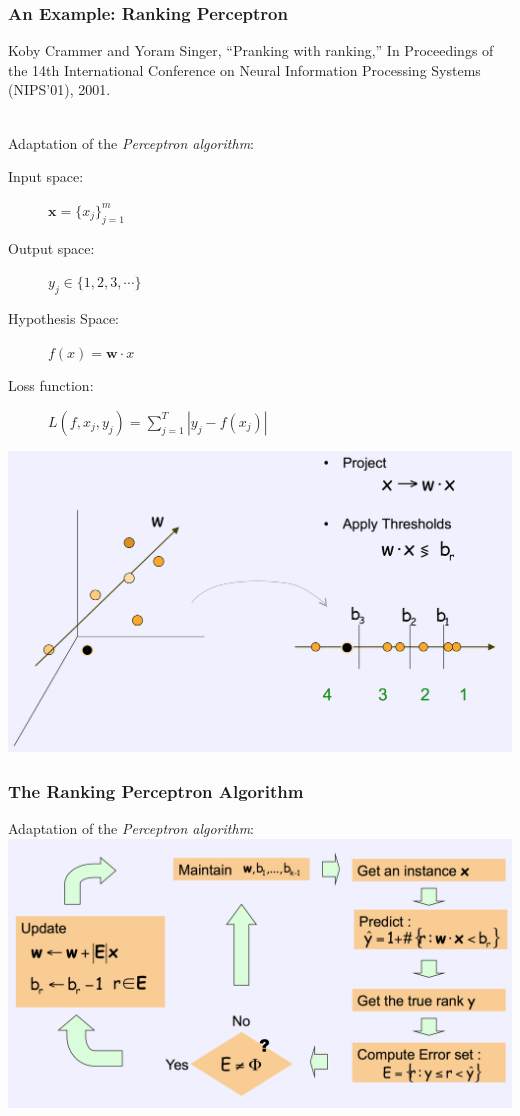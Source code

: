 \documentclass{beamer}
\begin{document}
\begin{frame}
    \frametitle{An Example: Ranking Perceptron}
    \begin{minipage}{1.0\linewidth}
        \footnotesize Koby Crammer and Yoram Singer, ``Pranking with ranking,''
        In Proceedings of the 14th International Conference on Neural
        Information Processing Systems (NIPS'01), 2001.
    \end{minipage}\\[\baselineskip]

    Adaptation of the \textit{Perceptron algorithm}:
    \vfill
    \begin{description}
    \item[Input space:] $\mathbf{x} = \{x_j\}_{j=1}^m$
    \item[Output space:] $y_j \in \{1, 2, 3, \cdots \}$
    \item[Hypothesis Space:] $f(x) = \mathbf{w} \cdot x$
    \item[Loss function:] $L(f, x_j, y_j) = \sum_{j=1}^T|y_j - f(x_j)|$
    \end{description}
    \vfill
    \centering
    \includegraphics[width=.7\linewidth]{pranking}
\end{frame}

\begin{frame}
    \frametitle{The Ranking Perceptron Algorithm}
    Adaptation of the \textit{Perceptron algorithm}:
    \vfill
    \centering
    \includegraphics[width=.8\linewidth]{pranking2}
\end{frame}
\end{document}
